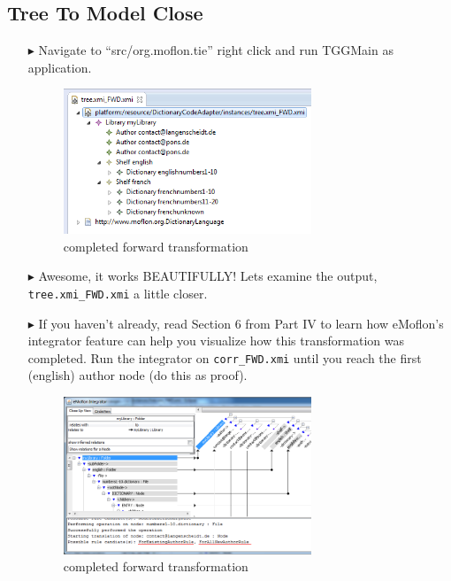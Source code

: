 \newpage
\hypertarget{t2m close}{}
\subsection{Tree To Model Close}
\genHeader

\begin{itemize}

\item[$\blacktriangleright$] Navigate to ``src/org.moflon.tie'' right click and run TGGMain as application.

\begin{figure}[htbp]
\begin{center}
  \includegraphics[width=0.7\textwidth]{eclipse_generatedForwardTransformation}
  \caption{completed forward transformation}
  \label{eclipse:generatedFwdTrsfm}
\end{center}
\end{figure}

\item[$\blacktriangleright$] Awesome, it works BEAUTIFULLY! Lets examine the output, \texttt{tree.xmi\_FWD.xmi} a little closer.

\item[$\blacktriangleright$] If you haven't already, read Section 6 from Part IV to learn how eMoflon's integrator feature can help you visualize how this
transformation was completed. Run the integrator on \texttt{corr\_FWD.xmi} until you reach the first (english) author node (do this as proof).

\begin{figure}[htbp]
\begin{center}
  \includegraphics[width=0.7\textwidth]{eclipse_integratorAuthorChoice}
  \caption{completed forward transformation}
  \label{eclipse:generatedFwdTrsfm}
\end{center}
\end{figure}


\end{itemize}

